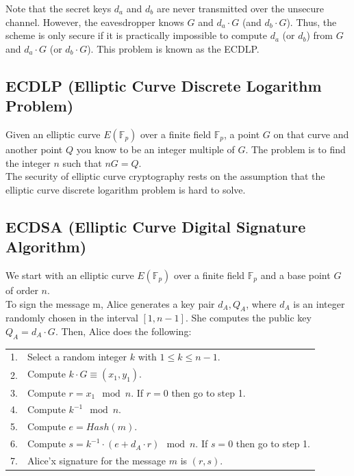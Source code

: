 Note that the secret keys $d_a$ and $d_b$ are never transmitted over the unsecure channel.
However, the eavesdropper knows $G$ and $d_a \cdot G$ (and $d_b \cdot G$).
Thus, the scheme is only secure if it is practically impossible to compute $d_a$ (or $d_b$) from $G$ and $d_a \cdot G$ (or $d_b \cdot G$).
This problem is known as the ECDLP.

\subsection{ECDLP (Elliptic Curve Discrete Logarithm Problem)}

Given an elliptic curve $E(\mathbb{F}_p)$ over a finite field $\mathbb{F}_p$, a point $G$ on that curve and another point $Q$ you know to be an integer multiple of $G$.
The problem is to find the integer $n$ such that $nG=Q$.\\
The security of elliptic curve cryptography rests on the assumption that the elliptic curve discrete logarithm problem is hard to solve.

\subsection{ECDSA (Elliptic Curve Digital Signature Algorithm)}
We start with an elliptic curve $E(\mathbb{F}_p)$ over a finite field $\mathbb{F}_p$ and a base point $G$ of order $n$.\\
To sign the message m, Alice generates a key pair $d_A, Q_A$, where $d_A$ is an integer randomly chosen in the interval $[1,n-1]$.
She computes the public key $Q_A = d_A \cdot G$.
Then, Alice does the following:\\
\begin{tabular}{l l}
	1. 	&	Select a random integer $k$ with $1 \leq k \leq n-1$. \\
	2. 	&	Compute $k \cdot G \equiv (x_1, y_1)$. \\
	3. 	&	Compute $r = x_1 \mod n$. If $r = 0$ then go to step 1.\\
	4. 	&	Compute $k^{-1} \mod n$.\\
	5. 	&	Compute $e = Hash(m)$.\\
	6. 	&	Compute $s=k^{-1} \cdot (e+d_A \cdot r) \mod n$. If $s = 0$ then go to step 1.\\
	7. 	&	Alice'x signature for the message $m$ is $(r, s)$.\\
\end{tabular}\\

